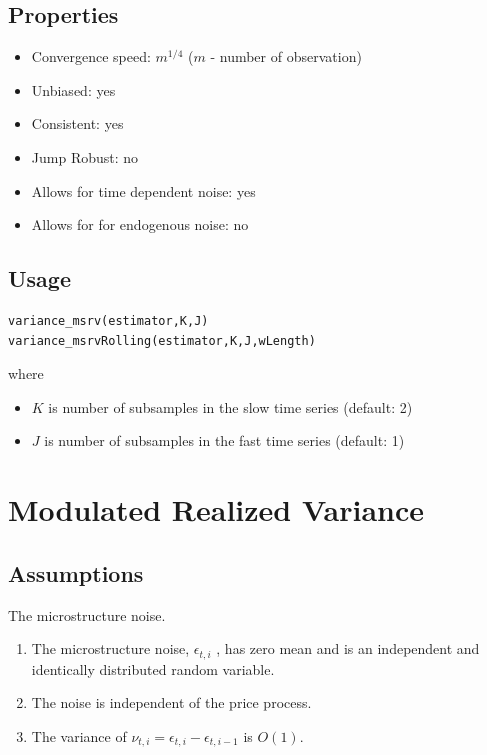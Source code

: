 \documentclass[letterpaper]{report}
\begin{document}
\subsection{Properties}
\begin{itemize}
\item Convergence speed: $m^{1/4}$ ($m$ - number of observation)
\item Unbiased: yes
\item Consistent: yes
\item Jump Robust: no
\item Allows for time dependent noise: yes
\item Allows for for endogenous noise: no
\end{itemize} 
 \subsection{Usage}
\begin{lstlisting}
variance_msrv(estimator,K,J)
variance_msrvRolling(estimator,K,J,wLength)
\end{lstlisting}
where

\begin{itemize}
\item $K$ is number of subsamples in the slow time series (default: 2)
\item $J$ is number of subsamples in the fast time series (default: 1)
\end{itemize}

\thispagestyle{plain}
 
\section{Modulated Realized Variance}
\subsection{Assumptions}
The microstructure noise.
\begin{enumerate}
\item The microstructure noise, $\epsilon_{t,i}$ , has zero mean and is an
independent and identically distributed random variable.
\item The noise is independent of the price process.
\item The variance of $\nu_{t,i} = \epsilon_{t,i} - \epsilon_{t,i-1}$ is
$O(1)$.
\end{enumerate}
\end{document}
